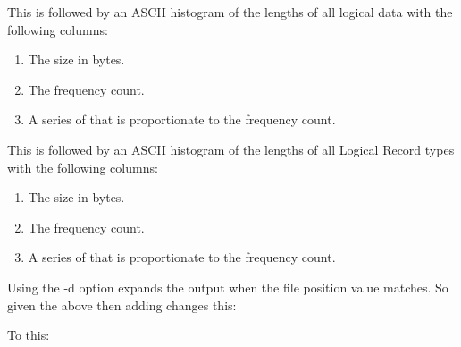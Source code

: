 \documentclass[letterpaper,10pt,english]{sphinxmanual}
\begin{document}
This is followed by an ASCII histogram of the lengths of all logical data with the following columns:
\begin{enumerate}
\item {} 
The size in bytes.

\item {} 
The frequency count.

\item {} 
A series of \sphinxcode{+} that is proportionate to the frequency count.

\end{enumerate}

This is followed by an ASCII histogram of the lengths of all Logical Record types with the following columns:
\begin{enumerate}
\item {} 
The size in bytes.

\item {} 
The frequency count.

\item {} 
A series of \sphinxcode{+} that is proportionate to the frequency count.

\end{enumerate}

Using the -d option expands the output when the file position value matches. So given the above then adding  changes this:

\begin{sphinxVerbatim}[commandchars=\\\{\}]
               
\end{sphinxVerbatim}

To this:

\begin{sphinxVerbatim}[commandchars=\\\{\}]
               
\end{sphinxVerbatim}
\end{document}
